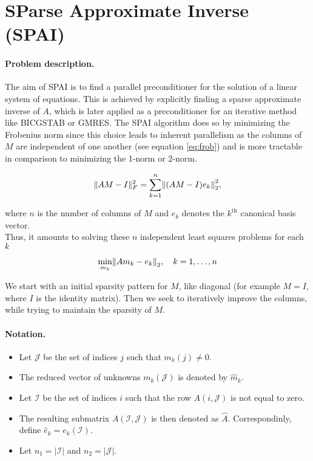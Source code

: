 \documentclass[paper=A4, fontsize=11pt]{scrartcl}
\let\originalleft\left
\let\originalright\right
\renewcommand{\left}{\mathopen{}\mathclose\bgroup\originalleft}
\renewcommand{\right}{\aftergroup\egroup\originalright}
\theoremstyle{remark}
\begin{document}
\section{SParse Approximate Inverse (SPAI)}

\paragraph{Problem description.} The aim of SPAI \cite{grote} is to find a parallel preconditioner for the solution of a linear system of equations. This is achieved by explicitly finding a sparse approximate inverse of $A$, which is later applied as a preconditioner for an iterative method like BICGSTAB or GMRES. The SPAI algorithm  does so by minimizing the Frobenius norm since this choice leads to inherent parallelism as the columns of  $M$ are independent of one another (see equation \eqref{eq:frob}) and is more tractable in comparison to minimizing the 1-norm or 2-norm.

\begin{equation}\label{eq:frob}
\|A M-I\|_{F}^{2}=\sum_{k=1}^{n}\left\|(A M-I) e_{k}\right\|_{2}^{2}, 
\end{equation}

where $n$ is the number of columns of $M$ and $e_k$ denotes the $k^{\text{th}}$ canonical basis vector. \\

Thus, it amounts to solving these $n$ independent least squares problems for each $k$


\begin{equation}\label{eq:indp}
\min _{m_{k}}\left\|A m_{k}-e_{k}\right\|_{2}, \quad k=1, \ldots, n
\end{equation}

We start with an initial sparsity pattern for $M$, like diagonal (for example $M = I$, where $I$ is the identity matrix). Then we seek to iteratively improve the columns, while trying to maintain the sparsity of $M$. 

\paragraph{Notation.}
\begin{itemize}
	\item Let \(\mathcal{J}\) be the set of indices \(j\) such that \(m_{k}(j) \neq 0\).
	\item The reduced vector of unknowns \(m_{k}(\mathcal{J})\) is denoted by \(\hat{m}_{k}\).
	\item Let \(\mathcal{I}\) be the set of
	indices \(i\) such that the row \(A(i, \mathcal{J})\) is not equal to zero.
	\item The resulting submatrix \(A(\mathcal{I}, \mathcal{J})\) is then denoted as \(\hat{A}\). Correspondinly, define \(\hat{e}_{k}=e_{k}(\mathcal{I}).\)
	\item Let \(n_{1}=|\mathcal{I}|\) and \(n_{2}=|\mathcal{J}|\).
	
\end{itemize}
\end{document}
